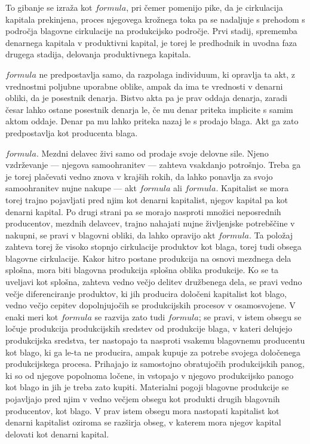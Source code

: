 \documentclass[a5paper]{scrbook}
\begin{document}
To gibanje se izraža kot \( formula \), pri čemer pomenijo pike, da je cirkulacija kapitala prekinjena, proces njegovega krožnega toka pa se nadaljuje s prehodom s področja blagovne cirkulacije na produkcijsko področje. Prvi stadij, sprememba denarnega kapitala v produktivni kapital, je torej le predhodnik in uvodna faza drugega stadija, delovanja produktivnega kapitala.

\( formula \) ne predpostavlja samo, da razpolaga individuum, ki opravlja ta akt, z vrednostmi poljubne uporabne oblike, ampak da ima te vrednosti v denarni obliki, da je posestnik denarja. Bistvo akta pa je prav oddaja denarja, zaradi česar lahko ostane posestnik denarja le, če mu denar priteka implicite s samim aktom oddaje. Denar pa mu lahko priteka nazaj le s prodajo blaga. Akt ga zato predpostavlja kot producenta blaga.

\( formula \). Mezdni delavec živi samo od prodaje svoje delovne sile. Njeno vzdrževanje --- njegova samoohranitev --- zahteva vsakdanjo potrošnjo. Treba ga je torej plačevati vedno znova v krajših rokih, da lahko ponavlja za svojo samoohranitev nujne nakupe --- akt \( formula \) ali \( formula \). Kapitalist se mora torej trajno pojavljati pred njim kot denarni kapitalist, njegov kapital pa kot denarni kapital. Po drugi strani pa se morajo nasproti množici neposrednih producentov, mezdnih delavcev, trajno nahajati nujne življenjske potrebščine v nakupni, se pravi v blagovni obliki, da lahko opravijo akt \( formula \). Ta položaj zahteva torej že visoko stopnjo cirkulacije produktov kot blaga, torej tudi obsega blagovne cirkulacije. Kakor hitro postane produkcija na osnovi mezdnega dela splošna, mora biti blagovna produkcija splošna oblika produkcije. Ko se ta uveljavi kot splošna, zahteva vedno večjo delitev družbenega dela, se pravi vedno večje diferenciranje produktov, ki jih producira določeni kapitalist kot blago, vedno večjo cepitev dopolnjujočih se produkcijskih procesov v osamosvojene. V enaki meri kot \( formula \) se razvija zato tudi \( formula \); se pravi, v istem obsegu se ločuje produkcija produkcijskih sredstev od produkcije blaga, v kateri delujejo produkcijska sredstva, ter nastopajo ta nasproti vsakemu blagovnemu producentu kot blago, ki ga le-ta ne producira, ampak kupuje za potrebe svojega določenega produkcijskega procesa. Prihajajo iz samostojno obratujočih produkcijskih panog, ki so od njegove popolnoma ločene, in vstopajo v njegovo produkcijsko panogo kot blago in jih je treba zato kupiti. Materialni pogoji blagovne produkcije se pojavljajo pred njim v vedno večjem obsegu kot produkti drugih blagovnih producentov, kot blago. V prav istem obsegu mora nastopati kapitalist kot denarni kapitalist oziroma se razširja obseg, v katerem mora njegov kapital delovati kot denarni kapital.
\end{document}
